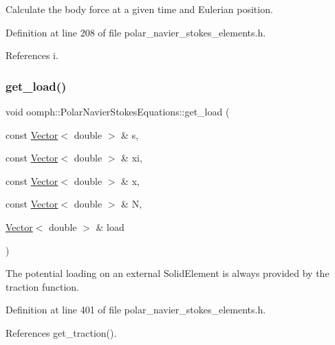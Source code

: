 Calculate the body force at a given time and Eulerian position. 



Definition at line 208 of file polar\+\_\+navier\+\_\+stokes\+\_\+elements.\+h.



References i.

\mbox{\label{classoomph_1_1PolarNavierStokesEquations_a47ae24dc603a7d46bd4a85ccfb2b8e23}} 
\subsubsection{\texorpdfstring{get\+\_\+load()}{get\_load()}}
{\footnotesize\ttfamily void oomph\+::\+Polar\+Navier\+Stokes\+Equations\+::get\+\_\+load (\begin{DoxyParamCaption}\item[{const \hyperlink{classoomph_1_1Vector}{Vector}$<$ double $>$ \&}]{s,  }\item[{const \hyperlink{classoomph_1_1Vector}{Vector}$<$ double $>$ \&}]{xi,  }\item[{const \hyperlink{classoomph_1_1Vector}{Vector}$<$ double $>$ \&}]{x,  }\item[{const \hyperlink{classoomph_1_1Vector}{Vector}$<$ double $>$ \&}]{N,  }\item[{\hyperlink{classoomph_1_1Vector}{Vector}$<$ double $>$ \&}]{load }\end{DoxyParamCaption})\hspace{0.3cm}{\ttfamily [inline]}}



The potential loading on an external Solid\+Element is always provided by the traction function. 



Definition at line 401 of file polar\+\_\+navier\+\_\+stokes\+\_\+elements.\+h.



References get\+\_\+traction().

\mbox{\label{classoomph_1_1PolarNavierStokesEquations_a6b9fb7f70c3a1858ee4c56bea63d8be2}} 
